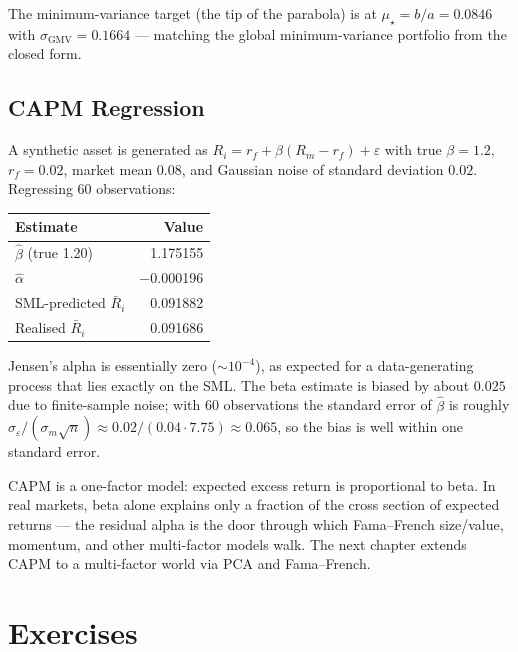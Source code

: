 The minimum-variance target (the tip of the parabola) is at
$\mu_\star = b/a = 0.0846$ with $\sigma_{\text{GMV}} = 0.1664$ --- matching
the global minimum-variance portfolio from the closed form.

\subsection{CAPM Regression}

A synthetic asset is generated as $R_i = r_f + \beta (R_m - r_f) + \varepsilon$
with true $\beta = 1.2$, $r_f = 0.02$, market mean $0.08$, and Gaussian
noise of standard deviation $0.02$. Regressing 60 observations:

\begin{center}
\begin{tabular}{lr}
\toprule
Estimate & Value \\
\midrule
$\hat{\beta}$ (true 1.20) & 1.175155 \\
$\hat{\alpha}$            & $-$0.000196 \\
SML-predicted $\bar{R}_i$ & 0.091882 \\
Realised $\bar{R}_i$       & 0.091686 \\
\bottomrule
\end{tabular}
\end{center}

Jensen's alpha is essentially zero ($\sim 10^{-4}$), as expected for a
data-generating process that lies exactly on the SML. The beta estimate
is biased by about $0.025$ due to finite-sample noise; with 60
observations the standard error of $\hat{\beta}$ is roughly
$\sigma_\varepsilon / (\sigma_m \sqrt{n}) \approx 0.02 / (0.04 \cdot
7.75) \approx 0.065$, so the bias is well within one standard error.

\begin{keyinsight}
CAPM is a one-factor model: expected excess return is proportional to
beta. In real markets, beta alone explains only a fraction of the cross
section of expected returns --- the residual alpha is the door through
which Fama--French size/value, momentum, and other multi-factor models
walk. The next chapter extends CAPM to a multi-factor world via PCA and
Fama--French.
\end{keyinsight}

\section{Exercises}

